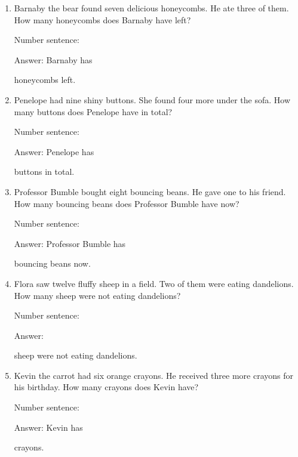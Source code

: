 \documentclass{tufte-book}
\begin{document}
\begin{enumerate}

\item
  Barnaby the bear found seven delicious honeycombs. He ate three of
  them. How many honeycombs does Barnaby have left?\medskip\par
  Number sentence:
  \dotfill\medskip\par
  Answer: Barnaby has
  \dotfill\medskip\par\mbox{}\dotfill\medskip\par\mbox{}\dotfill\bigskip
  honeycombs left.
\item
  Penelope had nine shiny buttons. She found four more under the sofa.
  How many buttons does Penelope have in total?\medskip\par
  Number sentence:
  \dotfill\medskip\par
  Answer: Penelope has
  \dotfill\medskip\par\mbox{}\dotfill\medskip\par\mbox{}\dotfill\bigskip
  buttons in total.
\item
  Professor Bumble bought eight bouncing beans. He gave one to his
  friend. How many bouncing beans does Professor Bumble have now?\medskip\par
  Number sentence:
  \dotfill\medskip\par
  Answer: Professor Bumble has
  \dotfill\medskip\par\mbox{}\dotfill\medskip\par\mbox{}\dotfill\bigskip
  bouncing beans now.
\item
  Flora saw twelve fluffy sheep in a field. Two of them were eating
  dandelions. How many sheep were not eating dandelions?\medskip\par
  Number sentence:
  \dotfill\medskip\par
  Answer:
  \dotfill\medskip\par\mbox{}\dotfill\medskip\par\mbox{}\dotfill\bigskip
  sheep were not eating dandelions.
\item
  Kevin the carrot had six orange crayons. He received three more
  crayons for his birthday. How many crayons does Kevin have?\medskip\par
  Number sentence:
  \dotfill\medskip\par
  Answer: Kevin has
  \dotfill\medskip\par\mbox{}\dotfill\medskip\par\mbox{}\dotfill\bigskip
  crayons.

\end{enumerate}
\end{document}
